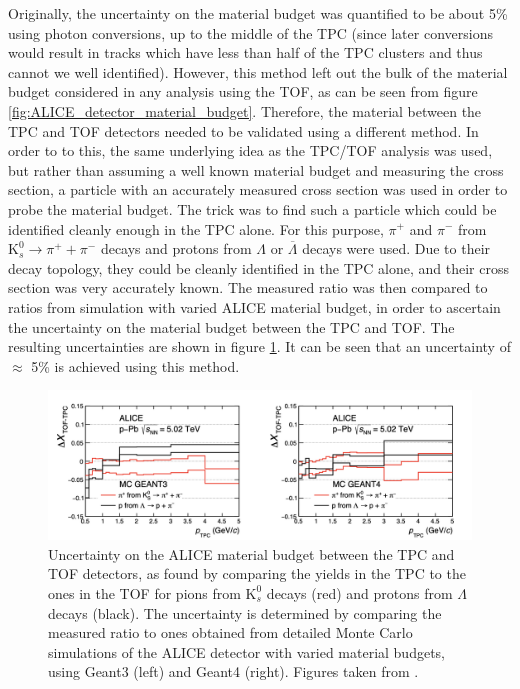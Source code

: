 Originally, the uncertainty on the material budget was quantified to be about 5\% using photon conversions\cite{photon_conversion}, up to the middle of the TPC (since later conversions would result in tracks which have less than half of the TPC clusters and thus cannot we well identified). However, this method left out the bulk of the material budget considered in any analysis using the TOF, as can be seen from figure \ref{fig:ALICE_detector_material_budget}. Therefore, the material between the TPC and TOF detectors needed to be validated using a different method. In order to to this, the same underlying idea as the TPC/TOF analysis was used, but rather than assuming a well known material budget and measuring the cross section, a particle with an accurately measured cross section was used in order to probe the material budget. The trick was to find such a particle which could be identified cleanly enough in the TPC alone. For this purpose, $\pi^+$ and $\pi^-$ from $\mathrm{K}_s^0 \rightarrow \pi^+ + \pi^-$ decays and protons from $\Lambda$ or $\overline{\Lambda}$ decays were used\cite{ALICE-PUBLIC-2022-002}. Due to their decay topology, they could be cleanly identified in the TPC alone, and their cross section was very accurately known. The measured ratio was then compared to ratios from simulation with varied ALICE material budget, in order to ascertain the uncertainty on the material budget between the TPC and TOF. The resulting uncertainties are shown in figure \ref{fig:ALICE_mat_budget}. It can be seen that an uncertainty of $\approx$ 5\% is achieved using this method. \\

\begin{figure}
    \centering
    \includegraphics[width=\textwidth]{figures/ALICE_material_budget_tests.png}
    \caption{Uncertainty on the ALICE material budget between the TPC and TOF detectors, as found by comparing the yields in the TPC to the ones in the TOF for pions from $\mathrm{K}_s^0$ decays (red) and protons from $\Lambda$ decays (black). The uncertainty is determined by comparing the measured ratio to ones obtained from detailed Monte Carlo simulations of the ALICE detector with varied material budgets, using Geant3 (left) and Geant4 (right). Figures taken from \cite{ALICE-PUBLIC-2022-001}.}
    \label{fig:ALICE_mat_budget}
\end{figure}

